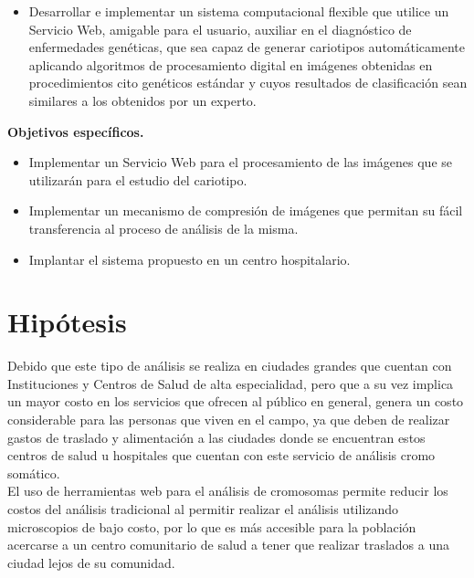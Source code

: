 \documentclass[12pt,letterpaper,titlepage]{article}
\begin{document}
\begin{itemize}\itemsep=0pt
\item Desarrollar e implementar un sistema computacional flexible que utilice un Servicio Web, amigable para el usuario, auxiliar en el diagnóstico de enfermedades genéticas, que sea capaz de generar cariotipos automáticamente aplicando algoritmos de procesamiento digital en imágenes obtenidas en procedimientos cito genéticos estándar y cuyos resultados de clasificación sean similares a los obtenidos por un experto.\\
\end{itemize}

\textbf{Objetivos específicos.}\\

\begin{itemize}\itemsep=0pt
\item Implementar un Servicio Web para el procesamiento de las imágenes que se utilizarán para el estudio del cariotipo.
\item Implementar un mecanismo de compresión de imágenes que permitan su fácil transferencia al proceso de análisis de la misma.
\item Implantar el sistema propuesto en un centro hospitalario.
\end{itemize}




\section{Hipótesis}\label{hipotesis}


Debido que este tipo de análisis se realiza en ciudades grandes que cuentan con Instituciones y Centros de Salud de alta especialidad, pero que a su vez implica un mayor costo en los servicios que ofrecen al público en general, genera un costo considerable para las personas que viven en el campo, ya que deben de realizar gastos de traslado y alimentación a las ciudades donde se encuentran estos centros de salud u hospitales que cuentan con este servicio de análisis cromo somático.\\

El uso de herramientas web para el análisis de cromosomas permite reducir los costos del análisis tradicional al permitir realizar el análisis utilizando microscopios de bajo costo, por lo que es más accesible para la población acercarse a un centro comunitario de salud a tener que realizar traslados a una ciudad lejos de su comunidad.\\
\end{document}
